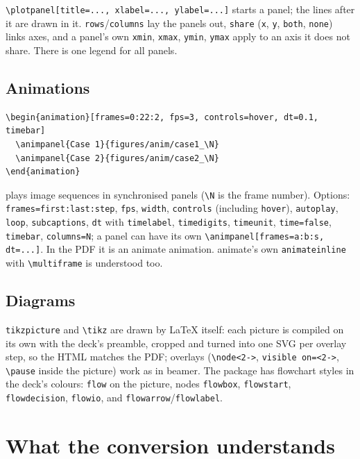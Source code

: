 \documentclass[a4paper,11pt]{article}
\newcommand\cs[1]{\texttt{\textbackslash #1}}
\newcommand\env[1]{\texttt{#1}}
\newcommand\opt[1]{\texttt{#1}}
\begin{document}
\verb|\plotpanel[title=..., xlabel=..., ylabel=...]| starts a panel; the
lines after it are drawn in it. \opt{rows}/\opt{columns} lay the panels
out, \opt{share} (\opt{x}, \opt{y}, \opt{both}, \opt{none}) links axes, and
a panel's own \opt{xmin}, \opt{xmax}, \opt{ymin}, \opt{ymax} apply to an
axis it does not share. There is one legend for all panels.

\subsection{Animations}

\begin{Verbatim}
\begin{animation}[frames=0:22:2, fps=3, controls=hover, dt=0.1, timebar]
  \animpanel{Case 1}{figures/anim/case1_\N}
  \animpanel{Case 2}{figures/anim/case2_\N}
\end{animation}
\end{Verbatim}
plays image sequences in synchronised panels (\cs{N} is the frame number).
Options: \opt{frames=first:last:step}, \opt{fps}, \opt{width},
\opt{controls} (including \opt{hover}), \opt{autoplay}, \opt{loop},
\opt{subcaptions}, \opt{dt} with \opt{timelabel}, \opt{timedigits},
\opt{timeunit}, \opt{time=false}, \opt{timebar}, \opt{columns=N}; a panel
can have its own \verb|\animpanel[frames=a:b:s, dt=...]|. In the PDF it is
an \textsf{animate} animation. \textsf{animate}'s own \env{animateinline}
with \cs{multiframe} is understood too.

\subsection{Diagrams}

\env{tikzpicture} and \cs{tikz} are drawn by LaTeX itself: each picture is
compiled on its own with the deck's preamble, cropped and turned into one
SVG per overlay step, so the HTML matches the PDF; overlays (\verb|\node<2->|,
\verb|visible on=<2->|, \cs{pause} inside the picture) work as in beamer.
The package has flowchart styles in the deck's colours: \opt{flow} on the
picture, nodes \opt{flowbox}, \opt{flowstart}, \opt{flowdecision},
\opt{flowio}, and \opt{flowarrow}/\opt{flowlabel}.

\section{What the conversion understands}
\end{document}
